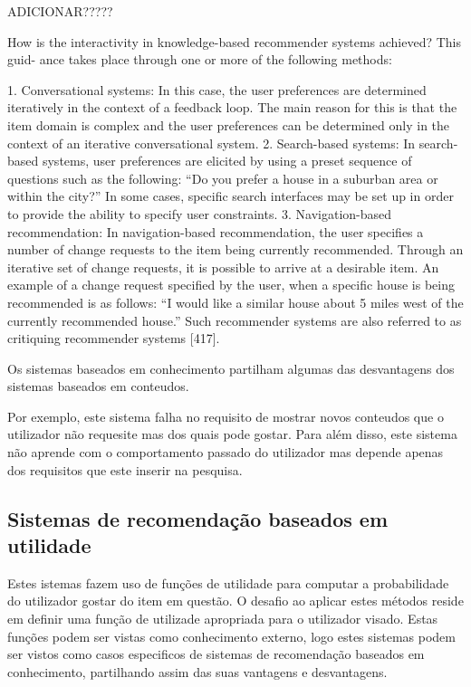 ADICIONAR?????

How is the interactivity in knowledge-based recommender systems achieved? This guid- ance takes place through one or more of the following methods:

1. Conversational systems: In this case, the user preferences are determined iteratively in the context of a feedback loop. The main reason for this is that the item domain is complex and the user preferences can be determined only in the context of an iterative conversational system.
2. Search-based systems: In search-based systems, user preferences are elicited by using a preset sequence of questions such as the following: “Do you prefer a house in a suburban area or within the city?” In some cases, specific search interfaces may be set up in order to provide the ability to specify user constraints.
3. Navigation-based recommendation: In navigation-based recommendation, the user specifies a number of change requests to the item being currently recommended. Through an iterative set of change requests, it is possible to arrive at a desirable item. An example of a change request specified by the user, when a specific house is being recommended is as follows: “I would like a similar house about 5 miles west of the currently recommended house.” Such recommender systems are also referred to as critiquing recommender systems [417].

\par Os sistemas baseados em conhecimento partilham algumas das desvantagens dos sistemas baseados em conteudos. 
\par Por exemplo, este sistema falha no requisito de mostrar novos conteudos que o utilizador não requesite mas dos quais pode gostar.
Para além disso, este sistema não aprende com o comportamento passado do utilizador mas depende apenas dos requisitos que este inserir na pesquisa.

\hfill
\subsection{Sistemas de recomendação baseados em utilidade}
\hfill
\par Estes istemas fazem uso de funções de utilidade para computar a probabilidade do utilizador gostar do item em questão. O desafio ao aplicar estes métodos reside em definir uma função de utilizade apropriada para o utilizador visado. Estas funções podem ser vistas como conhecimento externo, logo estes sistemas podem ser vistos como casos especificos de sistemas de recomendação baseados em conhecimento, partilhando assim das suas vantagens e desvantagens.

